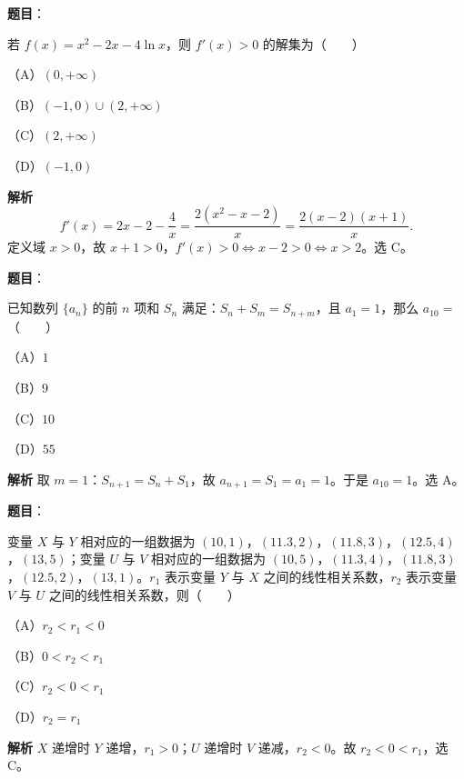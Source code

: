 \begin{answer}

\textbf{题目}：

若 $f(x)=x^2-2x-4\ln x$，则 $f'(x)>0$ 的解集为\mbox{（　　）}

（A）$(0,+\infty)$

（B）$(-1,0)\cup(2,+\infty)$

（C）$(2,+\infty)$

（D）$(-1,0)$

\textbf{解析}
\nopagebreak[4]
\[f'(x)=2x-2-\frac4x=\frac{2(x^2-x-2)}x=\frac{2(x-2)(x+1)}x.\]
定义域 $x>0$，故 $x+1>0$，$f'(x)>0\iff x-2>0\iff x>2$。选 C。


\end{answer}
\begin{answer}

\textbf{题目}：

已知数列 $\{a_n\}$ 的前 $n$ 项和 $S_n$ 满足：$S_n+S_m=S_{n+m}$，且 $a_1=1$，那么 $a_{10}=$\mbox{（　　）}

（A）$1$

（B）$9$

（C）$10$

（D）$55$

\textbf{解析}
取 $m=1$：$S_{n+1}=S_n+S_1$，故 $a_{n+1}=S_1=a_1=1$。于是 $a_{10}=1$。选 A。


\end{answer}
\begin{answer}

\textbf{题目}：

变量 $X$ 与 $Y$ 相对应的一组数据为 $(10,1)$，$(11.3,2)$，$(11.8,3)$，$(12.5,4)$，$(13,5)$；变量 $U$ 与 $V$ 相对应的一组数据为 $(10,5)$，$(11.3,4)$，$(11.8,3)$，$(12.5,2)$，$(13,1)$。$r_1$ 表示变量 $Y$ 与 $X$ 之间的线性相关系数，$r_2$ 表示变量 $V$ 与 $U$ 之间的线性相关系数，则\mbox{（　　）}

（A）$r_2<r_1<0$

（B）$0<r_2<r_1$

（C）$r_2<0<r_1$

（D）$r_2=r_1$

\textbf{解析}
$X$ 递增时 $Y$ 递增，$r_1>0$；$U$ 递增时 $V$ 递减，$r_2<0$。故 $r_2<0<r_1$，选 C。


\end{answer}
